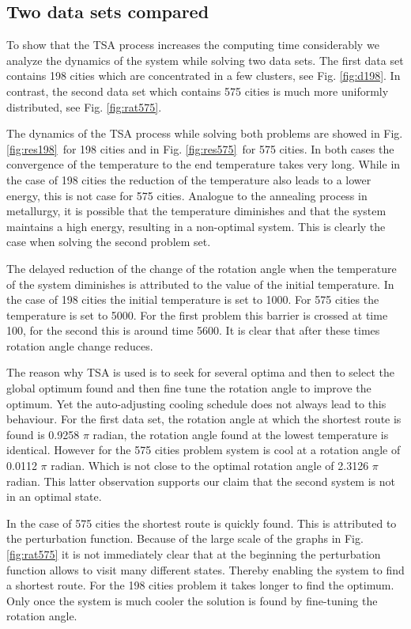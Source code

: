 \subsection{Two data sets compared}
To show that the TSA process increases the computing time considerably we
analyze the dynamics of the system while solving two data sets. The first data
set contains 198 cities which are concentrated in a few clusters, see Fig.
\ref{fig:d198}. In contrast, the second data set which contains 575 cities is
much more uniformly distributed, see Fig. \ref{fig:rat575}.

The dynamics of the TSA process while solving both problems are showed in Fig.
\ref{fig:res198}~for 198 cities and in Fig. \ref{fig:res575}~for 575 cities.
In both cases the convergence of the temperature to the end temperature takes
very long. While in the case of 198 cities the reduction of the temperature
also leads to a lower energy, this is not case for 575 cities. Analogue to the
annealing process in metallurgy, it is possible that the temperature
diminishes and that the system maintains a high energy, resulting in a
non-optimal system. This is clearly the case when solving the second problem set.

The delayed reduction of the change of the rotation angle when the temperature
of the system diminishes is attributed to the value of the initial
temperature. In the case of 198 cities the initial temperature is set to 1000.
For 575 cities the temperature is set to 5000. For the first problem this
barrier is crossed at time 100, for the second this is around time 5600.  It
is clear that after these times rotation angle change reduces.

The reason why TSA is used is to seek for several optima and then to select
the global optimum found and then fine tune the rotation angle to improve the
optimum. Yet the auto-adjusting cooling schedule does not always lead to this
behaviour. For the first data set, the rotation angle at which the shortest
route is found is 0.9258 $\pi$ radian, the rotation angle found at the lowest
temperature is identical. However for the 575 cities problem system is cool at
a rotation angle of 0.0112 $\pi$ radian. Which is not close to the optimal rotation
angle of 2.3126 $\pi$ radian. This latter observation supports our claim that the
second system is not in an optimal state.

In the case of 575 cities the shortest route is quickly found. This is
attributed to the perturbation function. Because of the large scale of the
graphs in Fig. \ref{fig:rat575} it is not immediately clear that at the
beginning the perturbation function allows to visit many different states.
Thereby enabling the system to find a shortest route. For the 198 cities
problem it takes longer to find the optimum. Only once the system is much
cooler the solution is found by fine-tuning the rotation angle.

